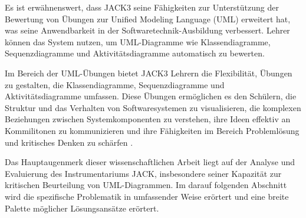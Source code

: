 Es ist erwähnenswert, dass JACK3 seine Fähigkeiten zur Unterstützung der Bewertung von Übungen zur Unified Modeling Language (UML) erweitert hat, was seine Anwendbarkeit in der Softwaretechnik-Ausbildung verbessert. Lehrer können das System nutzen, um UML-Diagramme wie Klassendiagramme, Sequenzdiagramme und Aktivitätsdiagramme automatisch zu bewerten.

Im Bereich der UML-Übungen bietet JACK3 Lehrern die Flexibilität, Übungen zu gestalten, die Klassendiagramme, Sequenzdiagramme und Aktivitätsdiagramme umfassen. Diese Übungen ermöglichen es den Schülern, die Struktur und das Verhalten von Softwaresystemen zu visualisieren, die komplexen Beziehungen zwischen Systemkomponenten zu verstehen, ihre Ideen effektiv an Kommilitonen zu kommunizieren und ihre Fähigkeiten im Bereich Problemlösung und kritisches Denken zu schärfen \cite{jack}.


Das Hauptaugenmerk dieser wissenschaftlichen Arbeit liegt auf der Analyse und Evaluierung des Instrumentariums JACK, insbesondere seiner Kapazität zur kritischen Beurteilung von UML-Diagrammen. Im darauf folgenden Abschnitt wird die spezifische Problematik in umfassender Weise erörtert und eine breite Palette möglicher Lösungsansätze erörtert.